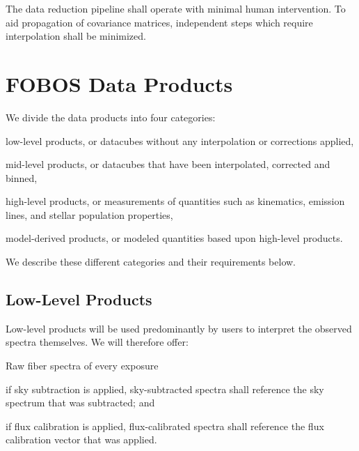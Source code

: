 \documentclass[11pt,a4paper,twoside,onecolumn,openany,final,oldfontcommands]{memoir}
\begin{document}
\medskip

\noindent The data reduction pipeline shall operate with minimal human intervention. To aid propagation of covariance matrices, independent steps which require interpolation shall be minimized.


\section{FOBOS Data Products} \label{sec:data_products}

We divide the data products into four categories:

\begin{datarequirement}

\reqitem low-level products, or datacubes without any interpolation or corrections applied,
    
\reqitem mid-level products, or datacubes that have been interpolated, corrected and binned,
    
\reqitem high-level products, or measurements of quantities such as kinematics, emission lines, and stellar population properties,
    
\reqitem model-derived products, or modeled quantities based upon high-level products.
    
\end{datarequirement}

\noindent We describe these different categories and their requirements below.

\subsection{Low-Level Products} \label{sec:low_level_products}

Low-level products will be used predominantly by users to interpret the observed spectra themselves. We will therefore offer:

\begin{datarequirement}

\reqitem Raw fiber spectra of every exposure
    
\reqitem if sky subtraction is applied, sky-subtracted spectra shall reference the sky spectrum that was subtracted; and
    
\reqitem if flux calibration is applied, flux-calibrated spectra shall reference the flux calibration vector that was applied.
    
\end{datarequirement}
\end{document}
